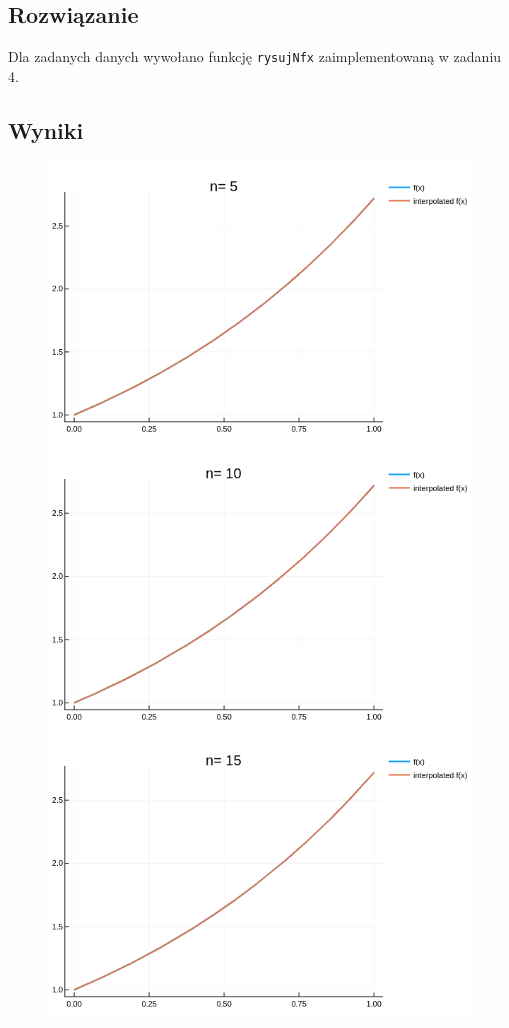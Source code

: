 \documentclass[12pt, a4paper]{article}
\begin{document}
\subsection{Rozwiązanie}
Dla zadanych danych wywołano funkcję \texttt{rysujNfx} zaimplementowaną w zadaniu 4.

\newpage

\subsection{Wyniki}

\begin{figure}[h]
    \centering
    \includegraphics[scale=0.35]{../plots/ex5/1.png}
    \includegraphics[scale=0.35]{../plots/ex5/4.png}
    \includegraphics[scale=0.35]{../plots/ex5/3.png}    

\end{figure}
\end{document}
